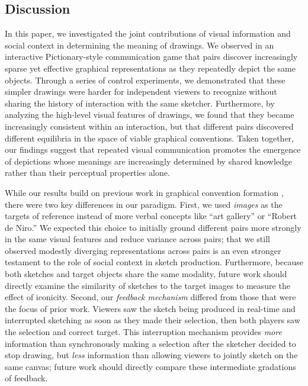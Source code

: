 \documentclass[10pt,letterpaper]{article}
\newcommand{\red}[1]{\textcolor{Red}{#1}}
\begin{document}


\subsection{Discussion}

In this paper, we investigated the joint contributions of visual information and social context in determining the meaning of drawings.
We observed in an interactive Pictionary-style communication game that pairs discover increasingly sparse yet effective graphical representations as they repeatedly depict the same objects.
Through a series of control experiments, we demonstrated that these simpler drawings were harder for independent viewers to recognize without sharing the history of interaction with the same sketcher.
Furthermore, by analyzing the high-level visual features of drawings, we found that they became increasingly consistent within an interaction, but that different pairs discovered different equilibria in the space of viable graphical conventions.
Taken together, our findings suggest that repeated visual communication promotes the emergence of depictions whose meanings are increasingly determined by shared knowledge rather than their perceptual properties alone.

While our results build on previous work in graphical convention formation \cite{garrod_foundations_2007,fay2010interactive}, there were two key differences in our paradigm.
First, we used \emph{images} as the targets of reference instead of more verbal concepts like ``art gallery'' or ``Robert de Niro.''
We expected this choice to initially ground different pairs more strongly in the same visual features and reduce variance across pairs; that we still observed modestly diverging representations across pairs is an even stronger testament  to the role of social context in sketch production.
Furthermore, because both sketches and target objects share the same modality, future work should directly examine the similarity of sketches to the target images to measure the effect of iconicity.
Second, our \emph{feedback mechanism} differed from those that were the focus of prior work.
Viewers saw the sketch being produced in real-time and interrupted sketching as soon as they made their selection, then both players saw the selection and correct target.
This interruption mechanism provides \emph{more} information than synchronously making a selection after the sketcher decided to stop drawing, but \emph{less} information than allowing viewers to jointly sketch on the same canvas; future work should directly compare these intermediate gradations of feedback.
\end{document}
